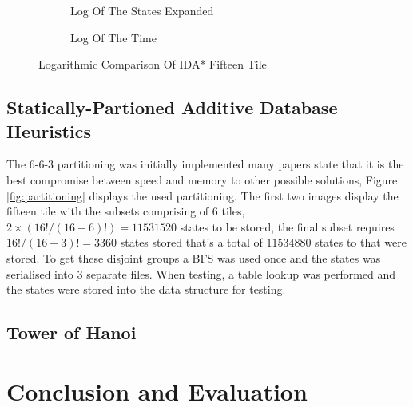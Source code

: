 \documentclass[final]{cmpreport}
\begin{document}
\begin{figure}[!ht]
	
	\begin{subfigure}[t]{.5\textwidth}
		\caption{Log Of The States Expanded}
	\end{subfigure}
	\begin{subfigure}[t]{.5\textwidth}
		\caption{Log Of The Time}
	\end{subfigure}
	\caption{Logarithmic Comparison Of IDA* Fifteen Tile}
\end{figure}



\subsection{Statically-Partioned Additive Database Heuristics}
The 6-6-3 partitioning  was initially implemented many papers state that it is the best compromise between speed and memory to other possible solutions, Figure \ref{fig:partitioning} displays the used partitioning. The first two images display the fifteen tile with the subsets comprising of 6 tiles, $2\times(16!/(16-6)!)= 11531520$ states to be stored, the final subset requires $16!/(16-3)!=3360$ states stored that's a total of $11534880$ states to that were stored. To get these disjoint groups a BFS was used once and the states was serialised into 3 separate files. When testing, a table lookup was performed and the states were stored into the data structure for testing.

\subsection{Tower of Hanoi}

\section{Conclusion and Evaluation}
\clearpage



\appendix
\clearpage
\end{document}
